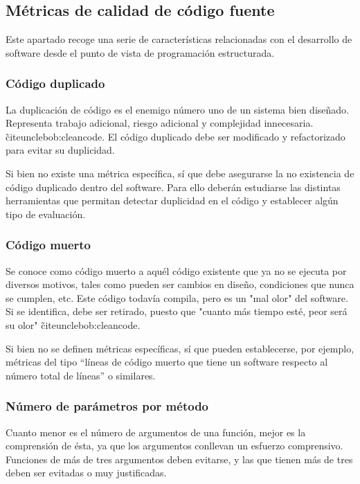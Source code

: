 \documentclass[11pt]{article}
\begin{document}
\subsection{Métricas de calidad de código fuente}

Este apartado recoge una serie de características relacionadas con el desarrollo de software desde el punto de vista de programación estructurada. 

\subsubsection{Código duplicado}

La duplicación de código es el enemigo número uno de un sistema bien diseñado. Representa trabajo adicional, riesgo adicional y complejidad innecesaria. \~cite{unclebob:cleancode}. El código duplicado debe ser modificado y refactorizado para evitar su duplicidad.

Si bien no existe una métrica específica, sí que debe asegurarse la no existencia de código duplicado dentro del software. Para ello deberán estudiarse las distintas herramientas que permitan detectar duplicidad en el código y establecer algún tipo de evaluación.

\subsubsection{Código muerto}
Se conoce como código muerto a aquél código existente que ya no se ejecuta por diversos motivos, tales como pueden ser cambios en diseño, condiciones que nunca se cumplen, etc. Este código todavía compila, pero es un "mal olor" del software. Si se identifica, debe ser retirado, puesto que "cuanto más tiempo esté, peor será su olor" \~cite{unclebob:cleancode}.

Si bien no se definen métricas específicas, sí que pueden establecerse, por ejemplo, métricas del tipo ``líneas de código muerto que tiene un software respecto al número total de líneas'' o similares.

\subsubsection{Número de parámetros por método}

Cuanto menor es el número de argumentos de una función, mejor es la comprensión de ésta, ya que los argumentos conllevan un esfuerzo comprensivo. Funciones de más de tres argumentos deben evitarse, y las que tienen más de tres deben ser evitadas o muy justificadas.
\end{document}
